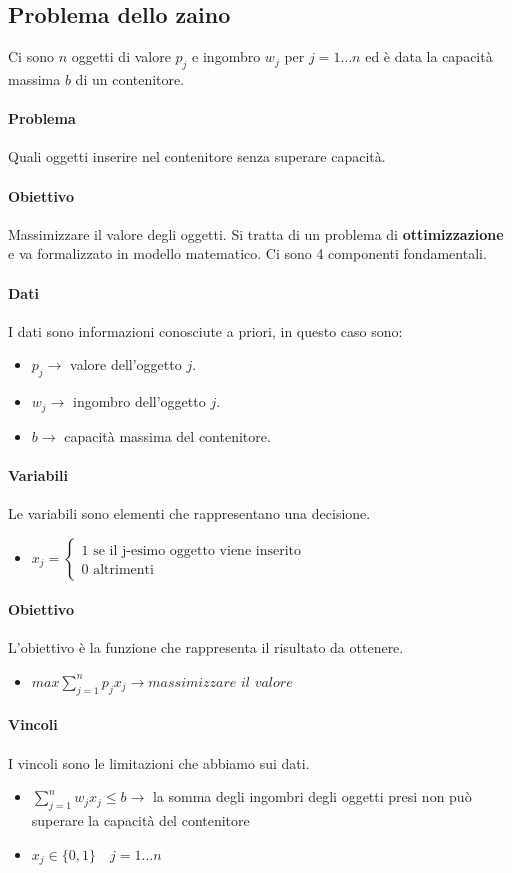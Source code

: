\documentclass[12pt, twoside, letterpaper]{article}
\newcommand{\problema}[5]{
	#1
	\begin{dati}
		\paragraph{Dati} #2
	\end{dati}
	\begin{variabili}
		\paragraph{Variabili} #3
	\end{variabili}
	\begin{obiettivo}
		\paragraph{Obiettivo} #4
	\end{obiettivo}
	\begin{vincoli}
		\paragraph{Vincoli} #5
	\end{vincoli}
}
\begin{document}
		\subsection{Problema dello zaino} 
				\problema{
					Ci sono $n$ oggetti di valore $p_j$ e ingombro $w_j$ per $j=1 \dots n$ ed è data la capacità massima $b$ di un contenitore.
			\paragraph{Problema} Quali oggetti inserire nel contenitore senza superare capacità. 
			\paragraph{Obiettivo}Massimizzare il valore degli oggetti. Si tratta di un problema di \textbf{ottimizzazione} e va formalizzato in modello matematico. Ci sono 4 componenti fondamentali.}
				{I dati sono informazioni conosciute a priori, in questo caso sono:
				\begin{itemize}
					\item $p_j \rightarrow$ valore dell'oggetto $j$.
					\item $w_j \rightarrow$ ingombro dell'oggetto $j$.
					\item $b \rightarrow$ capacità massima del contenitore.
				\end{itemize}}
				{Le variabili sono elementi che rappresentano una decisione. 
				\begin{itemize}
					\item $x_j= \begin{cases} \text{1 se il j-esimo oggetto viene inserito} \\ \text{0 altrimenti}\end{cases}$
				\end{itemize}}
				{L'obiettivo è la funzione che rappresenta il risultato da ottenere.
				\begin{itemize}
					\item $max \sum_{j=1}^np_jx_j \rightarrow \textit{massimizzare il valore}$
				\end{itemize}				  }
				{I vincoli sono le limitazioni che abbiamo sui dati. 
				\begin{itemize}
					\item $\sum_{j=1}^n w_j x_j \leq b \rightarrow$ la somma degli ingombri degli oggetti presi non può superare la capacità del contenitore 
					 \item $x_j \in \{0,1\} \quad j=1 \dots n$
				\end{itemize}}
		
\end{document}
